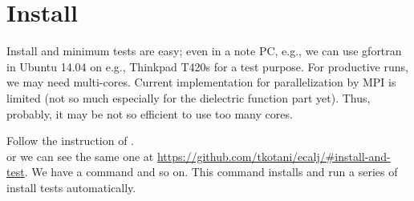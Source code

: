 \newpage
\section{Install}
\label{install}
Install and minimum tests are easy; even in a note PC, e.g.,
we can use gfortran in Ubuntu 14.04 on e.g., Thinkpad T420s for a test purpose.
For productive runs, we may need multi-cores. 
Current implementation for parallelization by MPI is limited
(not so much especially for the dielectric function part yet). 
Thus, probably, it may be not so efficient to use too many cores.

Follow the instruction of .\\
or we can see the same one at \url{https://github.com/tkotani/ecalj/#install-and-test}.
We have a command  and so on.
This command installs \ecalj and run a series of install tests automatically.


